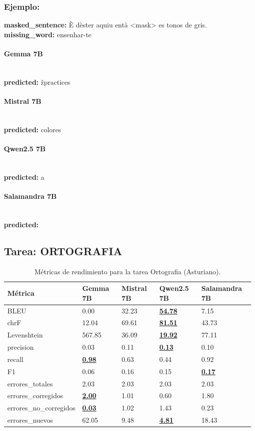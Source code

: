\subsubsection{Ejemplo:}
\textbf{masked\_sentence:} È d\textquotesingle{}èster aquiu entà {\textless}mask{\textgreater} es tonos de gris.\\
\textbf{missing\_word:} ensenhar-te

\paragraph{Gemma 7B}~\\
\textbf{predicted:} žpractices

\paragraph{Mistral 7B}~\\
\textbf{predicted:} colores

\paragraph{Qwen2.5 7B}~\\
\textbf{predicted:} a

\paragraph{Salamandra 7B}~\\
\textbf{predicted:} 

\subsection{Tarea: ORTOGRAFIA}\label{tarea-ortografia}
\begin{longtable}[]{@{}lllll@{}}
\toprule\noalign{}
Métrica & Gemma 7B & Mistral 7B & Qwen2.5 7B & Salamandra 7B \\
\midrule\noalign{}
\endhead
\bottomrule\noalign{}
\caption{Métricas de rendimiento para la tarea Ortografia (Asturiano).}
\label{tab:metricas_ortografia_Asturiano}
\endlastfoot
BLEU & 0.00 & 32.23 & \textbf{\underline{54.78}} & 7.15 \\
chrF & 12.04 & 69.61 & \textbf{\underline{81.51}} & 43.73 \\
Levenshtein & 567.85 & 36.09 & \textbf{\underline{19.92}} & 77.11 \\
precision & 0.03 & 0.11 & \textbf{\underline{0.13}} & 0.10 \\
recall & \textbf{\underline{0.98}} & 0.63 & 0.44 & 0.92 \\
F1 & 0.06 & 0.16 & 0.15 & \textbf{\underline{0.17}} \\
errores\_totales & 2.03 & 2.03 & 2.03 & 2.03 \\
errores\_corregidos & \textbf{\underline{2.00}} & 1.01 & 0.60 & 1.80 \\
errores\_no\_corregidos & \textbf{\underline{0.03}} & 1.02 & 1.43 & 0.23 \\
errores\_nuevos & 62.05 & 9.48 & \textbf{\underline{4.81}} & 18.43 \\
\end{longtable}


